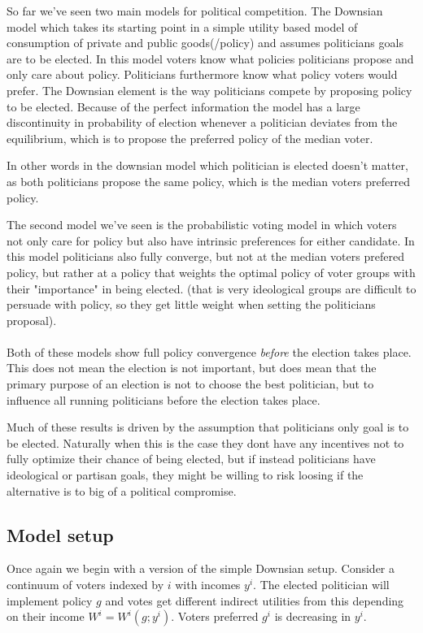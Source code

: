So far we've seen two main models for political competition. The Downsian model which takes its starting point in a simple utility based model of consumption of private and public goods(/policy) and assumes politicians goals are to be elected. In this model voters know what policies politicians propose and only care about policy. Politicians furthermore know what policy voters would prefer. The Downsian element is the way politicians compete by proposing policy to be elected. Because of the perfect information the model has a large discontinuity in probability of election whenever a politician deviates from the equilibrium, which is to propose the preferred policy of the median voter.

In other words in the downsian model which politician is elected doesn't matter, as both politicians propose the same policy, which is the median voters preferred policy. 

The second model we've seen is the probabilistic voting model in which voters not only care for policy but also have intrinsic preferences for either candidate. In this model politicians also fully converge, but not at the median voters prefered policy, but rather at a policy that weights the optimal policy of voter groups with their "importance" in being elected. (that is very ideological groups are difficult to persuade with policy, so they get little weight when setting the politicians proposal).
\\ \\ 
Both of these models show full policy convergence \textit{before} the election takes place. This does not mean the election is not important, but does mean that the primary purpose of an election is not to choose the best politician, but to influence all running politicians before the election takes place.

Much of these results is driven by the assumption that politicians only goal is to be elected. Naturally when this is the case they dont have any incentives not to fully optimize their chance of being elected, but if instead politicians have ideological or partisan goals, they might be willing to risk loosing if the alternative is to big of a political compromise.

\subsection{Model setup}
Once again we begin with a version of the simple Downsian setup. Consider a continuum of voters indexed by $i$ with incomes $y^i$. The elected politician will implement policy $g$ and votes get different indirect utilities from this depending on their income $W^i=W^i(g;y^i)$. Voters preferred $g^i$ is decreasing in $y^i$.

